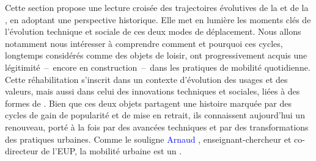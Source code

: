 \begin{refsegment}
Cette section propose une lecture croisée des trajectoires évolutives de la  et de la , en adoptant une perspective historique. Elle met en lumière les moments clés de l’évolution technique et sociale de ces deux modes de déplacement. Nous allons notamment nous intéresser à comprendre comment et pourquoi ces cycles, longtemps considérés comme des objets de loisir, ont progressivement acquis une légitimité~–~encore en construction~–~dans les pratiques de mobilité quotidienne. Cette réhabilitation s’inscrit dans un contexte d’évolution des usages et des valeurs, mais aussi dans celui des innovations techniques et sociales, liées à des formes de  \textcolor{blue}{\autocite{barthelot_retro-innovation_2018}}. Bien que ces deux objets partagent une histoire marquée par des cycles de gain de popularité et de mise en retrait, ils connaissent aujourd’hui un renouveau, porté à la fois par des avancées techniques et par des transformations des pratiques urbaines. Comme le souligne \textcolor{blue}{Arnaud} \textcolor{blue}{\textcite[26]{passalacqua_monde_2011}}, enseignant-chercheur et co-directeur de l'\acrfull{EUP}, la mobilité urbaine est un .%


\end{refsegment}
